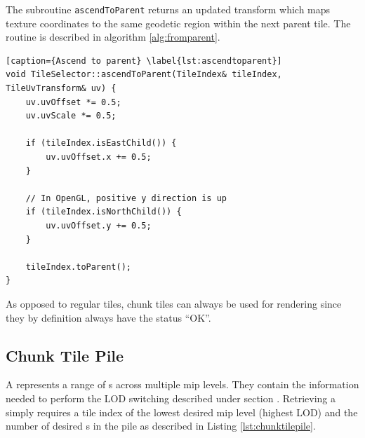  
The subroutine \texttt{ascendToParent} returns an updated transform which maps texture coordinates to the same geodetic region within the next parent tile. The routine is described in algorithm \ref{alg:fromparent}.

\begin{lstlisting}[caption={Ascend to parent} \label{lst:ascendtoparent}]
void TileSelector::ascendToParent(TileIndex& tileIndex, TileUvTransform& uv) {
    uv.uvOffset *= 0.5;
    uv.uvScale *= 0.5;

    if (tileIndex.isEastChild()) {
        uv.uvOffset.x += 0.5;
    }

    // In OpenGL, positive y direction is up
    if (tileIndex.isNorthChild()) {
        uv.uvOffset.y += 0.5;
    }

    tileIndex.toParent();
}
\end{lstlisting}

As opposed to regular tiles, chunk tiles can always be used for rendering since they by definition always have the status ``OK''.

\subsection{Chunk Tile Pile}
\label{section:chunktilepile}

A  represents a range of s across multiple mip levels. They contain the information needed to perform the LOD switching described under section . Retrieving a  simply requires a tile index of the lowest desired mip level (highest LOD) and the number of desired s in the pile as described in Listing \ref{lst:chunktilepile}.

